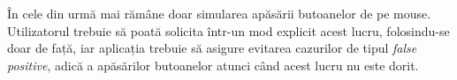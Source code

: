 În cele din urmă mai rămâne doar simularea apăsării butoanelor de pe mouse.
Utilizatorul trebuie să poată solicita într-un mod explicit acest lucru, folosindu-se doar de față, iar aplicația trebuie să asigure evitarea cazurilor de tipul \emph{false positive}, adică a apăsărilor butoanelor atunci când acest lucru nu este dorit.










